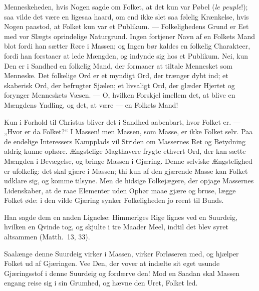 \documentclass[12pt,a4paper]{book}
\begin{document}
Menneskeheden, hvis Nogen sagde om Folket, at det kun var Pøbel (\textit{le peuple}!); saa
vilde det være en ligesaa haard, om end ikke slet saa følelig Krænkelse, hvis Nogen
paastod, at Folket kun var et Publikum. --- Folkelighedens Grund er Eet med vor Slægts
oprindelige Naturgrund. Ingen fortjener Navn af en Folkets Mand blot fordi han sætter Røre
i Massen; og Ingen bør kaldes en folkelig Charakteer, fordi han forstaaer at lede
Mængden, og indynde sig hos et Publikum. Nei, kun Den er i Sandhed en folkelig Mand, der
formaaer at tiltale Mennesket som Menneske. Det folkelige Ord er et myndigt Ord, der
trænger dybt ind; et skaberisk Ord, der befrugter Sjælen; et livsaligt Ord, der glæder
Hjertet og forynger Menneskets Væsen. --- O, hvilken Forskjel imellem det, at blive en
Mængdens Yndling, og det, at være --- en Folkets Mand!

Kun i Forhold til Christus bliver det i Sandhed aabenbart, hvor Folket er. --- „Hvor er da
Folket?“ I Massen! men Massen, som Masse, er ikke Folket selv. Paa de endelige Interessers
Kampplads vil Striden om Massernes Ret og Betydning aldrig kunne ophøre. Ængstelige
Magthavere frygte ethvert Ord, der kan sætte Mængden i Bevægelse, og bringe Massen i
Gjæring. Denne selviske Ængstelighed er ufolkelig: det skal gjære i Massen; thi kun af den
gjærende Masse kan Folket udklare sig, og komme
tilsyne. Men de hidsige Folkejægere, der opjage Massernes Lidenskaber, at de raae
Elementer uden Ophør maae gjære og bruse, lægge Folket øde: i den vilde Gjæring synker
Folkeligheden jo reent til Bunds.

\begingroup\large
Han sagde dem en anden Lignelse: Himmeriges Rige lignes ved en Suurdeig, hvilken en Qvinde
tog, og skjulte i tre Maader Meel, indtil det blev syret altsammen (Matth.\ 13, 33).
\par\endgroup

Saalænge denne Suurdeig virker i Massen, virker Forløseren med, og hjælper Folket ud af
Gjæringen. Vee Den, der vover at indælte sit eget usunde Gjæringsstof i denne Suurdeig og
fordærve den! Mod en Saadan skal Massen engang reise sig i sin Grumhed, og hævne den Uret,
Folket led.
\end{document}
